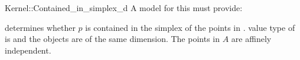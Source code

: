 \begin{ccRefFunctionObjectConcept}{Kernel::Contained_in_simplex_d}
A model for this must provide:


{determines whether $p$ is contained in the simplex
of the points in \ccc{A = tuple [first,last)}.
\ccPrecond value type of  is 
and the objects are of the same dimension. The points in $A$ are
affinely independent.}

\end{ccRefFunctionObjectConcept}
